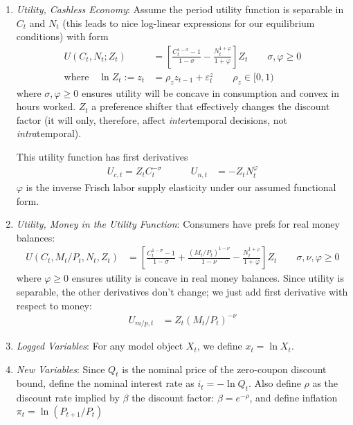\documentclass[12pt]{article}
\theoremstyle{plain}
\theoremstyle{definition}
\theoremstyle{remark}
\begin{document}
\begin{enumerate}
  \item \emph{Utility, Cashless Economy}:
    Assume the period utility function is separable in $C_t$ and $N_t$
    (this leads to nice log-linear expressions for our equilibrium
    conditions) with form
    \begin{align*}
      U(C_t,N_t;Z_t) &=
      \left[
        \frac{C_t^{1-\sigma}-1}{1-\sigma}
        -
        \frac{N_t^{1+\varphi}}{1+\varphi}
      \right] Z_t
      \qquad \sigma,\varphi \geq 0 \\
      \text{where}\quad
      \ln Z_t :=
      z_t &= \rho_z z_{t-1} + \varepsilon_t^z
      \qquad \rho_z\in[0,1)
    \end{align*}
    where $\sigma,\varphi\geq 0$ ensures utility will be concave in
    consumption and convex in hours worked.
    $Z_t$ a preference shifter that effectively changes the discount
    factor (it will only, therefore, affect \emph{inter}temporal
    decisions, not \emph{intra}temporal).

    This utility function has first derivatives
    \begin{align*}
      U_{c,t} = Z_t C_t^{-\sigma}
      \qquad\quad
      U_{n,t} &= -Z_t N_t^{\varphi}
    \end{align*}
    $\varphi$ is the inverse Frisch labor supply elasticity under our
    assumed functional form.


  \item \emph{Utility, Money in the Utility Function}:
    Consumers have prefs for real money balances:
    \begin{align*}
      U(C_t,M_t/P_t,N_t,Z_t) &=
      \left[
        \frac{C_t^{1-\sigma}-1}{1-\sigma}
        + \frac{(M_t/P_t)^{1-\nu}}{1-\nu}
        - \frac{N_t^{1+\varphi}}{1+\varphi}
      \right] Z_t
      \qquad \sigma,\nu,\varphi \geq 0
    \end{align*}
    where $\varphi\geq 0$ ensures utility is concave in real money
    balances.
    Since utility is separable, the other derivatives don't change; we
    just add first derivative with respect to money:
    \begin{align*}
      U_{m/p,t} &= Z_t (M_t/P_t)^{-\nu}
    \end{align*}

  \item \emph{Logged Variables}:
    For any model object $X_t$, we define
    $x_t = \ln X_t$.

  \item \emph{New Variables}:
    Since $Q_t$ is the nominal price of the zero-coupon discount bound,
    define the nominal interest rate as $i_t = -\ln Q_t$. Also define
    $\rho$ as the discount rate implied by $\beta$ the discount factor:
    $\beta = e^{-\rho}$, and define inflation $\pi_t=\ln(P_{t+1}/P_t)$


\end{enumerate}
\end{document}
